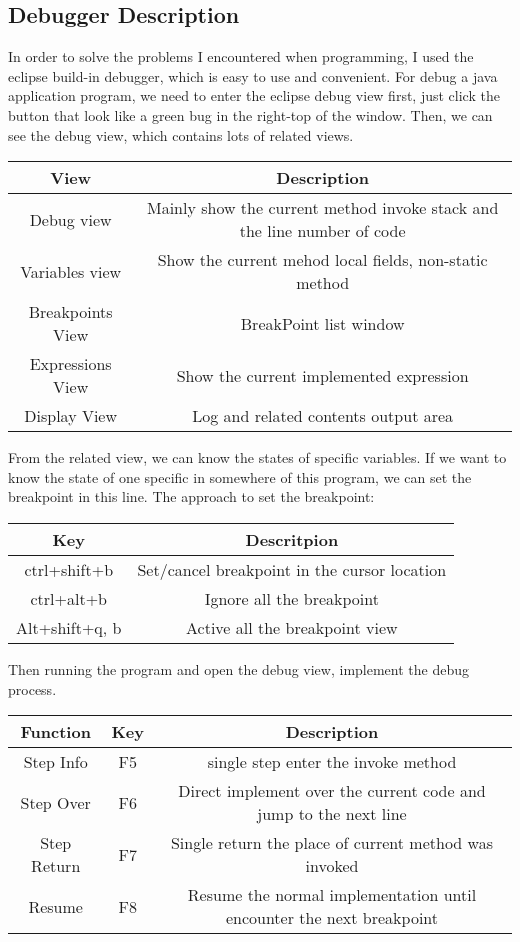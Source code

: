 \documentclass[11pt]{report}
\begin{document}
\subsection*{Debugger Description}
In order to solve the problems I encountered when programming, I used the eclipse build-in debugger, which is easy to use and convenient. For debug a java application program, we need to enter the eclipse debug view first, just click the button that look like a green bug in the right-top of the window. Then, we can see the debug view, which contains lots of related views.
\begin{center}
\begin{tabular}{|c|c|}
\hline 
View & Description\\
\hline  
Debug view & Mainly show the current method invoke stack and the line number of code\\
\hline
Variables view & Show the current mehod local fields, non-static method\\
\hline  
Breakpoints View & BreakPoint list window\\
\hline  
Expressions View & Show the current implemented expression\\
\hline  
Display View & Log and related contents output area\\
\hline  
\end{tabular}
\end{center}
From the related view, we can know the states of specific variables. If we want to know the state of one specific in somewhere of this program, we can set the breakpoint in this line. The approach to set the breakpoint:
\begin{center}
    \begin{tabular}{|c|c|}
    \hline
    Key&Descritpion\\
    \hline
    ctrl+shift+b&Set/cancel breakpoint in the cursor location\\
    \hline
    ctrl+alt+b&Ignore all the breakpoint\\
    \hline
    Alt+shift+q, b&Active all the breakpoint view\\
    \hline
    \end{tabular}
\end{center}
Then running the program and open the debug view, implement the debug process.
\begin{center}
    \begin{tabular}{|c|c|c|}
    \hline
    Function&Key&Description\\
    \hline
    Step Info&F5&single step enter the invoke method\\
    \hline
    Step Over&F6&Direct implement over the current code and jump to the next line\\
    \hline
    Step Return&F7&Single return the place of current method was invoked\\
    \hline
    Resume&F8&Resume the normal implementation until encounter the next breakpoint\\
    \hline
    \end{tabular}
\end{center}
\end{document}
